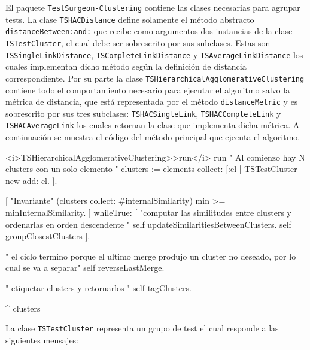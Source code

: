 
\par El paquete {\tt TestSurgeon-Clustering} contiene las clases necesarias para agrupar tests. La clase {\tt TSHACDistance} define solamente el método abstracto {\tt distanceBetween:and:} que recibe como argumentos dos instancias de la clase {\tt TSTestCluster}, el cual debe ser sobrescrito por sus subclases. Estas son {\tt TSSingleLinkDistance}, {\tt TSCompleteLinkDistance} y {\tt TSAverageLinkDistance} los cuales implementan dicho método según la definición de distancia correspondiente. Por su parte la clase {\tt TSHierarchicalAgglomerativeClustering} contiene todo el comportamiento necesario para ejecutar el algoritmo salvo la métrica de distancia, que está representada por el método {\tt distanceMetric} y es sobrescrito por sus tres subclases: {\tt TSHACSingleLink}, {\tt TSHACCompleteLink} y {\tt TSHACAverageLink} los cuales retornan la clase que implementa dicha métrica. A continuación se muestra el código del método principal que ejecuta el algoritmo.

\vspace*{2cm}

\begin{codeWithLineNumbers}
<i>TSHierarchicalAgglomerativeClustering>>run</i>
run
	" Al comienzo hay N clusters con un solo elemento "
	clusters := elements collect: [:el | TSTestCluster new add: el. ].
	
	[
		"Invariante"
		(clusters collect: #internalSimilarity) min >= minInternalSimilarity.
	] 
		whileTrue: [ 
			"computar las similitudes entre clusters y ordenarlas en orden descendente "
			self updateSimilaritiesBetweenClusters.
			self groupClosestClusters
	].
		
	" el ciclo termino porque el ultimo merge produjo un cluster no deseado, por lo cual se va a separar"
	self reverseLastMerge. 
	
	" etiquetar clusters y retornarlos "
	self tagClusters.
	
	^ clusters
\end{codeWithLineNumbers}

\clearpage
\par La clase {\tt TSTestCluster} representa un grupo de test el cual responde a las siguientes mensajes: 

